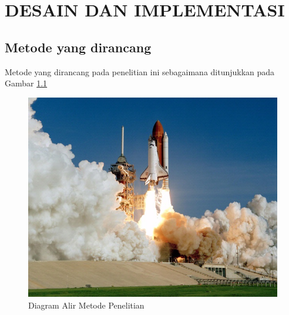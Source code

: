 \chapter{DESAIN DAN IMPLEMENTASI}
\label{chap:desainimplementasi}

\section{Metode yang dirancang}
\label{sec:metode yang dirancang}

Metode yang dirancang pada penelitian ini sebagaimana ditunjukkan pada Gambar \ref{fig:metode}

\begin{figure}[H]
  \centering
  \includegraphics[scale=0.35]{gambar/roketluarangkasa.jpg}

  \caption{Diagram Alir Metode Penelitian}
  \label{fig:metode}
\end{figure}

